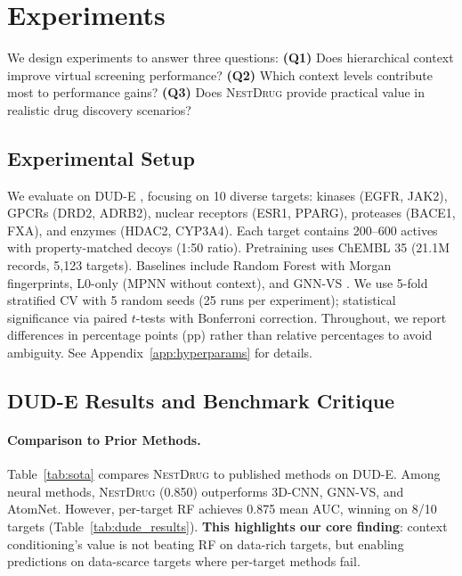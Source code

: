 \documentclass{article}
\newcommand{\methodname}{\textsc{NestDrug}}
\begin{document}
\section{Experiments}
\label{sec:experiments}

We design experiments to answer three questions: \textbf{(Q1)} Does hierarchical context improve virtual screening performance? \textbf{(Q2)} Which context levels contribute most to performance gains? \textbf{(Q3)} Does \methodname{} provide practical value in realistic drug discovery scenarios?

\subsection{Experimental Setup}

We evaluate on DUD-E \citep{mysinger_2012_dude}, focusing on 10 diverse targets: kinases (EGFR, JAK2), GPCRs (DRD2, ADRB2), nuclear receptors (ESR1, PPARG), proteases (BACE1, FXA), and enzymes (HDAC2, CYP3A4). Each target contains 200--600 actives with property-matched decoys (1:50 ratio). Pretraining uses ChEMBL 35 \citep{zdrazil_2024_chembl} (21.1M records, 5,123 targets). Baselines include Random Forest with Morgan fingerprints, L0-only (MPNN without context), and GNN-VS \citep{lim_2019_gnn_vs}. We use 5-fold stratified CV with 5 random seeds (25 runs per experiment); statistical significance via paired $t$-tests with Bonferroni correction. Throughout, we report differences in percentage points (pp) rather than relative percentages to avoid ambiguity. See Appendix~\ref{app:hyperparams} for details.

\subsection{DUD-E Results and Benchmark Critique}

\paragraph{Comparison to Prior Methods.} Table~\ref{tab:sota} compares \methodname{} to published methods on DUD-E. Among neural methods, \methodname{} (0.850) outperforms 3D-CNN, GNN-VS, and AtomNet. However, per-target RF achieves 0.875 mean AUC, winning on 8/10 targets (Table~\ref{tab:dude_results}). \textbf{This highlights our core finding}: context conditioning's value is not beating RF on data-rich targets, but enabling predictions on data-scarce targets where per-target methods fail.
\end{document}
